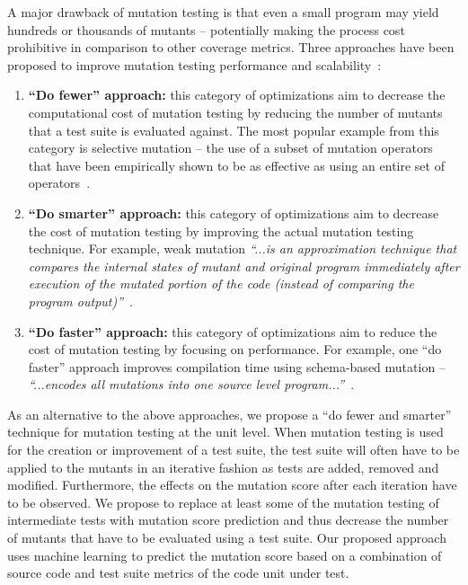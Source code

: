 \documentclass[10pt,conference,compsocconf]{IEEEtran}
\begin{document}
A major drawback of mutation testing is that even a small program may yield hundreds or thousands of mutants -- potentially making the process cost prohibitive in comparison to other coverage metrics. Three approaches have been proposed to improve mutation testing performance and scalability~\cite{OU00}:

\begin{enumerate}
  \item \textbf{``Do fewer'' approach:} this category of optimizations aim to decrease the computational cost of mutation testing by reducing the number of mutants that a test suite is evaluated against. The most popular example from this category is selective mutation -- the use of a subset of mutation operators that have been empirically shown to be as effective as using an entire set of operators~\cite{OLR+96}.

  \item \textbf{``Do smarter'' approach:} this category of optimizations aim to decrease the cost of mutation testing by improving the actual mutation testing technique. For example, weak mutation \emph{``...is an approximation technique that compares the internal states of mutant and original program immediately after execution of the mutated portion of the code (instead of comparing the program output)''}~\cite{OU00}.

  \item \textbf{``Do faster'' approach:} this category of optimizations aim to reduce the cost of mutation testing by focusing on performance. For example, one ``do faster'' approach improves compilation time using schema-based mutation -- \emph{``...encodes all mutations into one source level program...''}~\cite{OU00}.
\end{enumerate}

As an alternative to the above approaches, we propose a ``do fewer and smarter'' technique for mutation testing at the unit level.  When mutation testing is used for the creation or improvement of a test suite,  the test suite will often have to be applied to the mutants in an iterative fashion as tests are added, removed and modified. Furthermore, the effects on the mutation score after each iteration have to be observed. We propose to replace at least some of the mutation testing of intermediate tests with mutation score prediction and thus decrease the number of mutants that have to be evaluated using a test suite. Our proposed approach uses machine learning to predict the mutation score based on a combination of source code and test suite metrics of the code unit under test.
\end{document}
